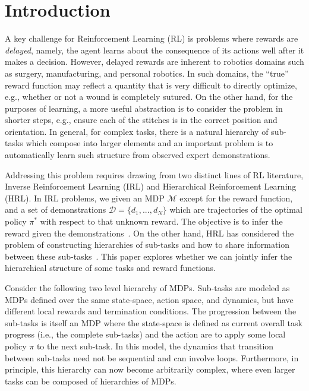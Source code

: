 \section{Introduction}
A key challenge for Reinforcement Learning (RL) is problems where rewards are \emph{delayed}, namely, the agent learns about the consequence of its actions well after it makes a decision.
However, delayed rewards are inherent to robotics domains such as surgery, manufacturing, and personal robotics.
In such domains, the ``true'' reward function may reflect a quantity that is very difficult to directly optimize, e.g., whether or not a wound is completely sutured.
On the other hand, for the purposes of learning, a more useful abstraction is to consider the problem in shorter steps, e.g., ensure each of the stitches is in the correct position and orientation. 
In general, for complex tasks, there is a natural hierarchy of sub-tasks which compose into larger elements and an important problem is to automatically learn such structure from observed expert demonstrations.

Addressing this problem requires drawing from two distinct lines of RL literature, Inverse Reinforcement Learning (IRL) and Hierarchical Reinforcement Learning (HRL). In IRL problems, we given an MDP $\mathcal{M}$ except for the reward function, and a set of demonstrations $\mathcal{D}=\{d_1,...,d_N\}$ which are trajectories of the optimal policy $\pi^*$ with respect to that unknown reward.
The objective is to infer the reward given the demonstrations~\cite{DBLP:conf/icml/NgHR99,DBLP:conf/aaai/ZiebartMBD08, coates2008learning, DBLP:conf/ijcai/MacGlashanL15, DBLP:conf/aaai/JudahFTG14}.
On the other hand, HRL has considered the problem of constructing hierarchies of sub-tasks and how to share information between these sub-tasks~\cite{csimcsek2004using,menache2002q,mcgovern2001automatic, dietterich2000hierarchical}.
This paper explores whether we can jointly infer the hierarchical structure of some tasks and reward functions.

Consider the following two level hierarchy of MDPs.
Sub-tasks are modeled as MDPs defined over the same state-space, action space, and dynamics, but have different local rewards and termination conditions.
The progression between the sub-tasks is itself an MDP where the state-space is defined as current overall task progress (i.e., the complete sub-tasks) and the action are to apply some local policy $\pi$ to the next sub-task.
In this model, the dynamics that transition between sub-tasks need not be sequential and can involve loops. 
Furthermore, in principle, this hierarchy can now become arbitrarily complex, where even larger tasks can be composed of hierarchies of MDPs.

